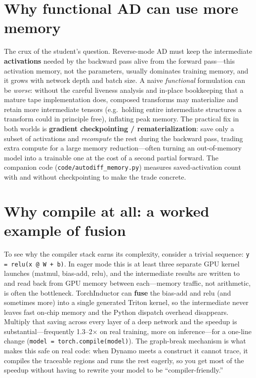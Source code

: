 \documentclass[11pt]{article}
\begin{document}
\section{Why functional AD can use more memory}
The crux of the student's question. Reverse-mode AD must keep the intermediate \textbf{activations} needed
by the backward pass alive from the forward pass---this activation memory, not the parameters, usually
dominates training memory, and it grows with network depth and batch size. A naive \emph{functional}
formulation can be \emph{worse}: without the careful liveness analysis and in-place bookkeeping that a mature
tape implementation does, composed transforms may materialize and retain more intermediate tensors (e.g.\
holding entire intermediate structures a transform could in principle free), inflating peak memory. The
practical fix in both worlds is \textbf{gradient checkpointing / rematerialization}: save only a subset of
activations and \emph{recompute} the rest during the backward pass, trading extra compute for a large memory
reduction---often turning an out-of-memory model into a trainable one at the cost of a second partial
forward. The companion code (\texttt{code/autodiff\_memory.py}) measures saved-activation count with and
without checkpointing to make the trade concrete.

\section{Why compile at all: a worked example of fusion}
To see why the compiler stack earns its complexity, consider a trivial sequence: \texttt{y = relu(x @ W +
b)}. In eager mode this is at least three separate GPU kernel launches (matmul, bias-add, relu), and the
intermediate results are written to and read back from GPU memory between each---memory traffic, not
arithmetic, is often the bottleneck. TorchInductor can \textbf{fuse} the bias-add and relu (and sometimes
more) into a single generated Triton kernel, so the intermediate never leaves fast on-chip memory and the
Python dispatch overhead disappears. Multiply that saving across every layer of a deep network and the
speedup is substantial---frequently 1.3--2$\times$ on real training, more on inference---for a one-line
change (\texttt{model = torch.compile(model)}). The graph-break mechanism is what makes this safe on real
code: when Dynamo meets a construct it cannot trace, it compiles the traceable regions and runs the rest
eagerly, so you get most of the speedup without having to rewrite your model to be ``compiler-friendly.''
\end{document}
